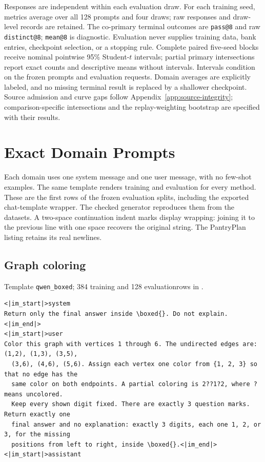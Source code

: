Responses are independent within each evaluation draw. For each training
seed, metrics average over all 128 prompts and four draws; raw responses
and draw-level records are retained. The co-primary terminal outcomes are
\texttt{pass@8} and raw \texttt{distinct@8}; \texttt{mean@8} is diagnostic.
Evaluation never supplies training data, bank entries, checkpoint selection,
or a stopping rule. Complete paired five-seed blocks receive nominal
pointwise 95\% Student-$t$ intervals; partial primary intersections report
exact counts and descriptive means without intervals. Intervals condition
on the frozen prompts and evaluation requests. Domain averages are
explicitly labeled, and no missing terminal result is replaced by a
shallower checkpoint. Source admission and curve gaps follow
Appendix~\ref{app:source-integrity}; comparison-specific intersections and
the replay-weighting bootstrap are specified with their results.

\section{Exact Domain Prompts}
\label{app:prompts}

Each domain uses one system message and one user message, with no few-shot
examples. The same template renders training and evaluation for every
method. These are the first rows of the frozen evaluation splits, including
the exported chat-template wrapper. The checked generator
 reproduces them from the datasets.
A two-space continuation indent marks display wrapping: joining it to the
previous line with one space recovers the original string. The PantryPlan
listing retains its real newlines.


\subsection{Graph coloring}
\label{app:prompt-graph}

\noindent Template \texttt{qwen\_boxed}; 384 training and 128 evaluation\linebreak rows in .

\begin{Verbatim}[fontsize=\scriptsize,frame=single,framesep=4pt,rulecolor=\color{black!25}]
<|im_start|>system
Return only the final answer inside \boxed{}. Do not explain.<|im_end|>
<|im_start|>user
Color this graph with vertices 1 through 6. The undirected edges are: (1,2), (1,3), (3,5),
  (3,6), (4,6), (5,6). Assign each vertex one color from {1, 2, 3} so that no edge has the
  same color on both endpoints. A partial coloring is 2??1?2, where ? means uncolored.
  Keep every shown digit fixed. There are exactly 3 question marks. Return exactly one
  final answer and no explanation: exactly 3 digits, each one 1, 2, or 3, for the missing
  positions from left to right, inside \boxed{}.<|im_end|>
<|im_start|>assistant
\end{Verbatim}


